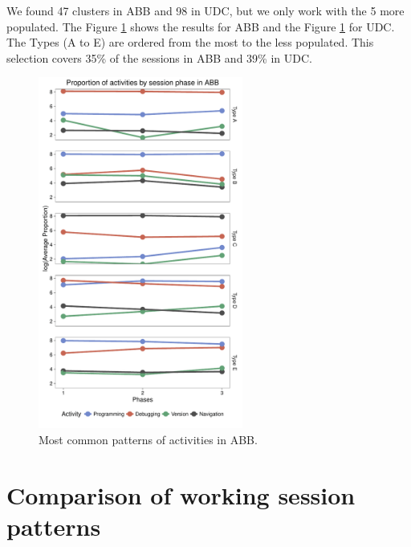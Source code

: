 We found 47 clusters in ABB and 98 in UDC, but we only work with the 5 more populated. The Figure \ref{ABB_phases} shows the results for ABB and the Figure \ref{ABB_phases} for UDC. The Types (A to E) are ordered from the most to the less populated. This selection covers 35\% of the sessions in ABB and 39\% in UDC. 

\begin{figure}[!ht]
	
	\centering
	\includegraphics[width=0.6\textwidth]{Figures/ABB_phases_log}
	
	\caption{Most common patterns of activities in ABB.}
	\label{ABB_phases}
\end{figure}

\section{Comparison of working session patterns}


